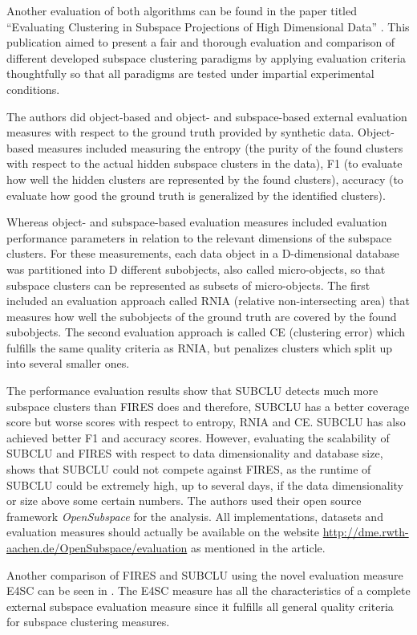 Another evaluation of both algorithms can be found in the paper titled “Evaluating Clustering in Subspace Projections of High Dimensional Data” \citep{10.14778/1687627.1687770}. This publication aimed to present a fair and thorough evaluation and comparison of different developed subspace clustering paradigms by applying evaluation criteria thoughtfully so that all paradigms are tested under impartial experimental conditions. 

The authors did object-based and object- and subspace-based external evaluation measures with respect to the ground truth provided by synthetic data. Object-based measures included measuring the entropy (the purity of the found clusters with respect to the actual hidden subspace clusters in the data), F1 (to evaluate how well the hidden clusters are represented by the found clusters), accuracy (to evaluate how good the ground truth is generalized by the identified clusters).

Whereas object- and subspace-based evaluation measures included evaluation performance parameters in relation to the relevant dimensions of the subspace clusters. For these measurements, each data object in a D-dimensional database was partitioned into D different subobjects, also called micro-objects, so that subspace clusters can be represented as subsets of micro-objects. The first included an evaluation approach called RNIA (relative non-intersecting area) that measures how well the subobjects of the ground truth are covered by the found subobjects. The second evaluation approach is called CE (clustering error) which fulfills the same quality criteria as RNIA, but penalizes clusters which split up into several smaller ones.

The performance evaluation results show that SUBCLU detects much more subspace clusters than FIRES does and therefore, SUBCLU has a better coverage score but worse scores with respect to entropy, RNIA and CE. SUBCLU has also  achieved better F1 and accuracy scores. However, evaluating the scalability of SUBCLU and FIRES with respect to data dimensionality and database size, shows that SUBCLU could not compete against FIRES, as the runtime of SUBCLU could be extremely high, up to several days, if the data dimensionality or size above some certain numbers. The authors used their open source framework \textit{OpenSubspace} for the analysis. All implementations, datasets and evaluation measures should actually be available on the website  \href{http://dme.rwth-aachen.de/OpenSubspace/evaluation}{http://dme.rwth-aachen.de/OpenSubspace/evaluation} as mentioned in the article.

Another comparison of FIRES and SUBCLU using the novel evaluation measure E4SC can be seen in \citep{10.1145/2063576.2063774}. The E4SC measure has all the characteristics of a complete external subspace evaluation measure since it fulfills all general quality criteria for subspace clustering measures.
